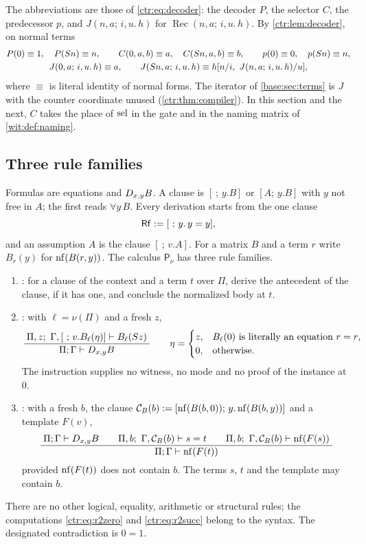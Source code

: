 The abbreviations are those of \eqref{ctr:eq:decoder}: the decoder $P$, the
selector $C$, the predecessor $p$, and $J(n,a;\,i,u.\,h)$ for
$\operatorname{Rec}(n,a;\,i,u.\,h)$.  By \cref{ctr:lem:decoder}, on normal
terms
\begin{gather*}
 P(0)\equiv 1,\quad P(S n)\equiv n,\qquad
 C(0,a,b)\equiv a,\quad C(S n,a,b)\equiv b,\qquad
 p(0)\equiv 0,\quad p(S n)\equiv n,\\
 J(0,a;\,i,u.\,h)\equiv a,\qquad
 J(S n,a;\,i,u.\,h)\equiv h[n/i,\ J(n,a;\,i,u.\,h)/u],
\end{gather*}
where $\equiv$ is literal identity of normal forms.  The iterator of
\cref{base:sec:terms} is $J$ with the counter coordinate unused
(\cref{ctr:thm:compiler}).  In this section and the next, $C$ takes the
place of $\operatorname{sel}$ in the gate and in the naming matrix of
\cref{wit:def:naming}.

\subsection{Three rule families}

Formulas are equations and $D_{x,y}B$.  A clause is $[\ ;\,y.B]$ or
$[A;\,y.B]$ with $y$ not free in $A$; the first reads $\forall y\,B$.  Every
derivation starts from the one clause
\[
 \mathsf{Rf}\mathrel{:=}[\ ;\,y.\,y=y],
\]
and an assumption $A$ is the clause $[\ ;\,v.A]$.  For a matrix $B$ and a
term $r$ write $B_r(y)$ for $\operatorname{nf}(B(r,y))$.  The calculus
$\mathsf{P}_{\nu}$ has three rule families.
\begin{enumerate}[label=\textup{(\roman*)}]
\item {}: for a clause of the context and a term $t$ over
 $\Pi$, derive the antecedent of the clause, if it has one, and conclude
 the normalized body at $t$.
\item {}: with $\ell=\nu(\Pi)$ and a fresh $z$,
\[
 \infrule{\Pi,z;\ \Gamma,[\ ;\,v.B_\ell(\eta)]\proves B_\ell(\Suc z)}
         {\Pi;\Gamma\proves\D{x}{y}B}
 \qquad
 \eta=\begin{cases}
  z,&\text{$B_\ell(0)$ is literally an equation $r=r$,}\\
  0,&\text{otherwise.}
 \end{cases}
\]
 The instruction supplies no witness, no mode and no proof of the instance
 at $0$.
\item {}: with a fresh $b$, the clause
 $\mathcal{C}_B(b)\mathrel{:=}[\operatorname{nf}(B(b,0));\,y.\operatorname{nf}(B(b,y))]$ and a template
 $F(v)$,
\[
 \dfrac{\;\Pi;\Gamma\vdash D_{x,y}B\qquad
          \Pi,b;\ \Gamma,\mathcal{C}_B(b)\vdash s=t\qquad
          \Pi,b;\ \Gamma,\mathcal{C}_B(b)\vdash\operatorname{nf}(F(s))\;}{\;\Pi;\Gamma\vdash\operatorname{nf}(F(t))\;}
\]
 provided $\operatorname{nf}(F(t))$ does not contain $b$.  The terms $s$, $t$ and the
 template may contain $b$.
\end{enumerate}
There are no other logical, equality, arithmetic or structural rules; the
computations \eqref{ctr:eq:r2zero} and \eqref{ctr:eq:r2succ} belong to the syntax.  The designated
contradiction is $0=1$.

